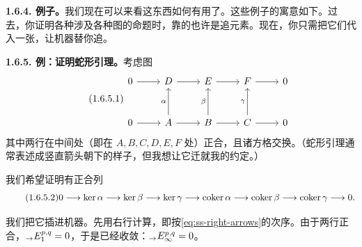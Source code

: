\textbf{1.6.4. 例子。}\quad 我们现在可以来看这东西如何有用了。这些例子的寓意如下。过去，你证明各种涉及各种图的命题时，靠的也许是追元素。现在，你只需把它们代入一张\trSpectralSequence，让\trSpectralSequence{}机器替你追。

\textbf{1.6.5. 例：证明蛇形引理。}\quad 考虑图
\begin{equation*}\tag{1.6.5.1}\label{eq:snake-lemma-grid}
\begin{tikzcd}[row sep=2.8em, column sep=2.4em]
0 \ar[r] & D \ar[r] & E \ar[r] & F \ar[r] & 0 \\
0 \ar[r] & A \ar[u,"\alpha"] \ar[r] & B \ar[u,"\beta"] \ar[r] & C \ar[u,"\gamma"] \ar[r] & 0
\end{tikzcd}
\end{equation*}
其中两行在中间处（即在 $A,B,C,D,E,F$ 处）正合，且诸方格交换。（蛇形引理通常表述成竖直箭头朝下的样子，但我想让它迁就我的\trSpectralSequence{}约定。）

我们希望证明有正合列
\begin{equation*}\tag{1.6.5.2}\label{eq:snake-lemma-les}
0\longrightarrow\ker\alpha\longrightarrow\ker\beta\longrightarrow\ker\gamma
\longrightarrow\operatorname{coker}\alpha\longrightarrow\operatorname{coker}\beta\longrightarrow\operatorname{coker}\gamma\longrightarrow 0.
\end{equation*}

我们把它插进\trSpectralSequence{}机器。先用右行\trOrientation{}计算\trCohomology，即按\eqref{eq:ss-right-arrows}的次序。由于两行正合，${}_{\to}E^{p,q}_{1}=0$，于是\trSpectralSequence{}已经收敛：${}_{\to}E^{p,q}_{\infty}=0$。


